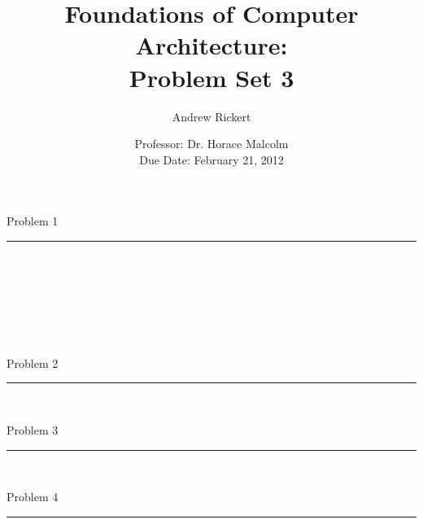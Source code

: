 \documentclass[11pt,reqno]{article}
\title{Foundations of Computer Architecture: \\ Problem Set 3 }
\author{Andrew Rickert}
\date{Professor: Dr. Horace Malcolm \\ \hspace{-19pt} Due Date: February 21,  2012}                                           %
\begin{document}
\maketitle


\begin{flushleft} 
Problem 1 \\
\rule{500pt}{1pt}\\
\end{flushleft} 
\\ 

\noindent{}\\ 

\noindent{}\\ 

\noindent{}\\ 


\begin{flushleft} 
Problem 2 \\
\rule{500pt}{1pt}\\
\end{flushleft} 

\begin{flushleft} 
Problem 3 \\
\rule{500pt}{1pt}\\
\end{flushleft} 

\begin{flushleft} 
Problem 4 \\
\rule{500pt}{1pt}\\
\end{flushleft} 
\\ 

\noindent{}\\ 
\end{document}
